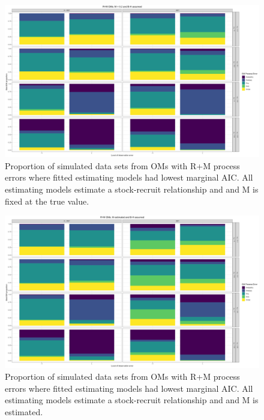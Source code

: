 \documentclass[
  12pt,
]{article}
\begin{document}
\begin{landscape}
\begin{figure}
\caption{Proportion of simulated data sets from OMs with R+M process errors where fitted estimating models had lowest marginal AIC. All estimating models estimate a stock-recruit relationship and and M is fixed at the true value.} \label{M_om_proportion_best_aic_SR_MF}
\begin{center}
\includegraphics[width = \textwidth]{M_om_proportion_best_aic_SR_MF.png}
\end{center}
\end{figure}
\end{landscape}

\begin{landscape}
\begin{figure}
\caption{Proportion of simulated data sets from OMs with R+M process errors where fitted estimating models had lowest marginal AIC. All estimating models estimate a stock-recruit relationship and and M is estimated.} \label{M_om_proportion_best_aic_SR_ME}
\begin{center}
\includegraphics[width = \textwidth]{M_om_proportion_best_aic_SR_ME.png}
\end{center}
\end{figure}
\end{landscape}
\end{document}
